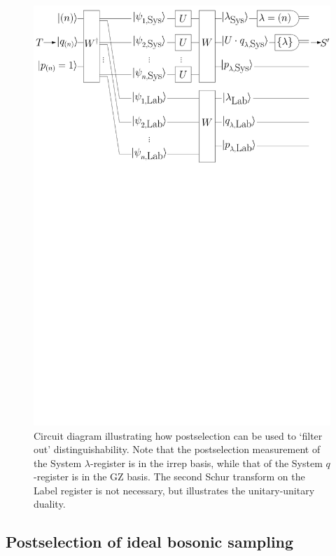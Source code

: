 \begin{figure}
\includegraphics[width=\linewidth]{noisy_circuit/post_circuit}
\caption[Circuit diagram illustrating how postselection can be used to `filter out' distinguishability]{Circuit diagram illustrating how postselection can be used to `filter out' distinguishability.
Note that the postselection measurement of the System $\lambda$-register is in the irrep basis, while that of the System $q$-register is in the GZ basis.
The second Schur transform on the Label register is not necessary, but illustrates the unitary-unitary duality.}
\label{fig:noisy-bs-rep}
\end{figure}


\subsection{Postselection of ideal bosonic sampling}
\label{sec:post-bs}


